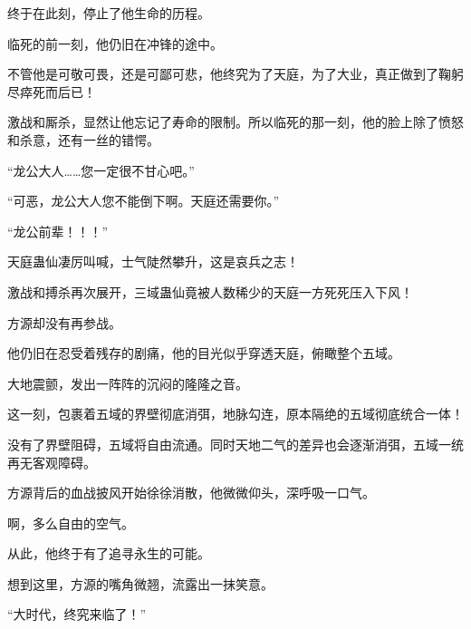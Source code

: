 \begin{this_body}
终于在此刻，停止了他生命的历程。

临死的前一刻，他仍旧在冲锋的途中。

不管他是可敬可畏，还是可鄙可悲，他终究为了天庭，为了大业，真正做到了鞠躬尽瘁死而后已！

激战和厮杀，显然让他忘记了寿命的限制。所以临死的那一刻，他的脸上除了愤怒和杀意，还有一丝的错愕。

“龙公大人……您一定很不甘心吧。”

“可恶，龙公大人您不能倒下啊。天庭还需要你。”

“龙公前辈！！！”

天庭蛊仙凄厉叫喊，士气陡然攀升，这是哀兵之志！

激战和搏杀再次展开，三域蛊仙竟被人数稀少的天庭一方死死压入下风！

方源却没有再参战。

他仍旧在忍受着残存的剧痛，他的目光似乎穿透天庭，俯瞰整个五域。

大地震颤，发出一阵阵的沉闷的隆隆之音。

这一刻，包裹着五域的界壁彻底消弭，地脉勾连，原本隔绝的五域彻底统合一体！

没有了界壁阻碍，五域将自由流通。同时天地二气的差异也会逐渐消弭，五域一统再无客观障碍。

方源背后的血战披风开始徐徐消散，他微微仰头，深呼吸一口气。

啊，多么自由的空气。

从此，他终于有了追寻永生的可能。

想到这里，方源的嘴角微翘，流露出一抹笑意。

“大时代，终究来临了！”

\end{this_body}


